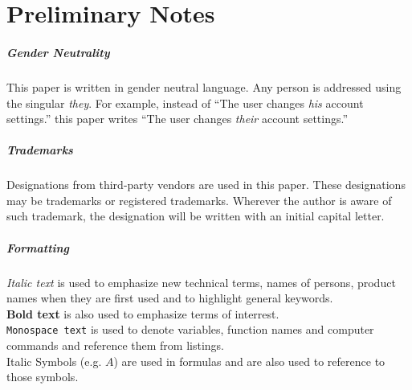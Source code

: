 \clearpage
\chapter*{Preliminary Notes}
\label{chap:prenotes}
\thispagestyle{scrheadings}

\paragraph{Gender Neutrality}
This paper is written in gender neutral language.
Any person is addressed using the singular \emph{they}.
For example, instead of
``The user changes \emph{his} account settings.''
this paper writes
``The user changes \emph{their} account settings.''


\paragraph{Trademarks}
Designations from third-party vendors are used in this paper.
These designations may be trademarks or registered trademarks.
Wherever the author is aware of such trademark,
the designation will be written with an initial capital letter.

\paragraph{Formatting}
\emph{Italic text} is used to emphasize new technical terms, names of persons, product names when they are first used and to highlight general keywords.\\ 
\textbf{Bold text} is also used to emphasize terms of interrest. \\ 
\texttt{Monospace text} is used to denote variables,  function names and computer commands and reference them from listings.\\
Italic Symbols (e.g. $A$) are used in formulas and are also used to reference to those symbols.

